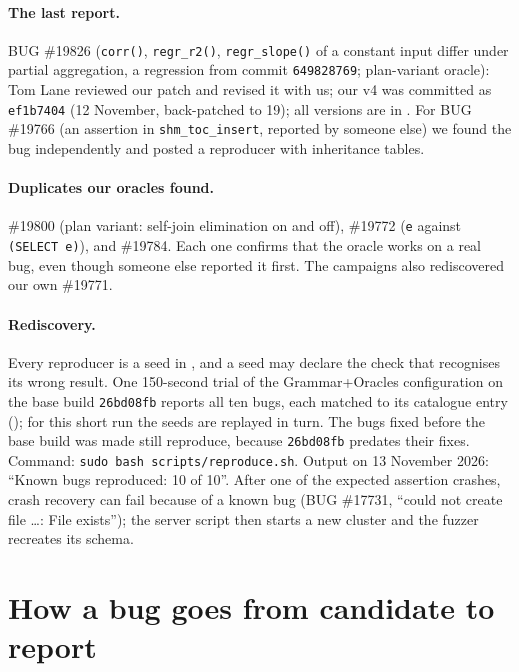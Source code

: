 \paragraph{The last report.} BUG \#19826 (\texttt{corr()}, \texttt{regr\_r2()},
\texttt{regr\_slope()} of a constant input differ under partial aggregation, a
regression from commit \texttt{649828769}; plan-variant oracle): Tom Lane reviewed our patch and revised it with us; our v4 was committed as \texttt{ef1b7404} (12 November, back-patched to 19); all versions are in . For BUG
\#19766 (an assertion in \texttt{shm\_toc\_insert}, reported by someone else) we
found the bug independently and posted a reproducer with inheritance tables.

\paragraph{Duplicates our oracles found.} \#19800 (plan variant: self-join
elimination on and off), \#19772 (\texttt{e} against \texttt{(SELECT e)}),
and \#19784. Each one confirms that the oracle works on a real bug, even though
someone else reported it first. The campaigns also rediscovered our own \#19771.

\paragraph{Rediscovery.} Every reproducer is a seed in
, and a seed may declare the check that recognises
its wrong result. One 150-second trial of the Grammar+Oracles configuration on
the base build \texttt{26bd08fb} reports all ten bugs, each matched to its
catalogue entry (); for this short run the seeds are replayed
in turn. The bugs fixed
before the base build was made still reproduce, because \texttt{26bd08fb}
predates their fixes. Command: \texttt{sudo bash scripts/reproduce.sh}.
Output on 13 November 2026: ``Known bugs reproduced: 10 of 10''.
After one of the expected assertion crashes, crash recovery can fail because of a known
bug (BUG \#17731, ``could not create file \dots: File exists''); the server script then
starts a new cluster and the fuzzer recreates its schema.

\section{How a bug goes from candidate to report}


